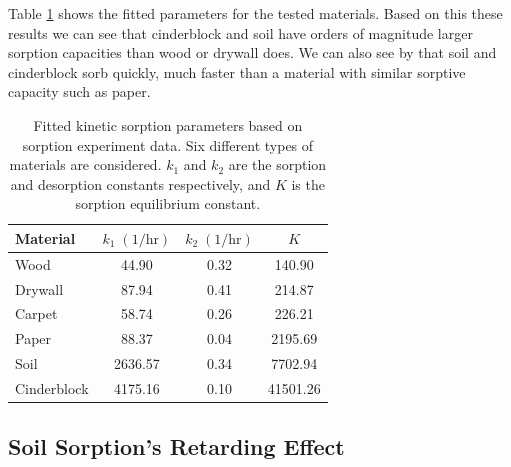 Table \ref{tbl:sorption_fit} shows the fitted parameters for the tested materials.
Based on this these results we can see that cinderblock and soil have orders of magnitude larger sorption capacities than wood or drywall does.
We can also see by that soil and cinderblock sorb quickly, much faster than a material with similar sorptive capacity such as paper.\par

\begin{table}[htb!]
  \caption{Fitted kinetic sorption parameters based on sorption experiment data. Six different types of materials are considered. $k_1$ and $k_2$ are the sorption and desorption constants respectively, and $K$ is the sorption equilibrium constant.}
  \label{tbl:sorption_fit}
  \centering
  \begin{tabular}{l c c c}
    \toprule
    Material & $k_1 \; \mathrm{(1/hr)}$ & $k_2 \; \mathrm{(1/hr)}$ & $K$ \\
    \hline
    Wood & 44.90 & 0.32 & 140.90 \\
    Drywall & 87.94 & 0.41 & 214.87 \\
    Carpet & 58.74 & 0.26 & 226.21 \\
    Paper & 88.37 & 0.04 & 2195.69 \\
    Soil & 2636.57 & 0.34 & 7702.94 \\
    Cinderblock & 4175.16 & 0.10 & 41501.26 \\
    \bottomrule
  \end{tabular}
\end{table}

\subsection{Soil Sorption's Retarding Effect}\label{sec:retardation_effect}

